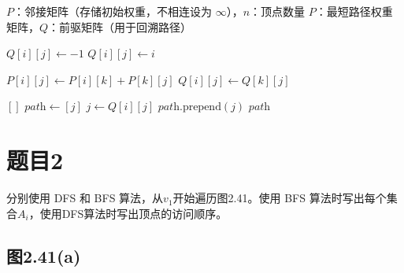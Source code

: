 \documentclass[utf8]{ctexart}
\theoremstyle{mystyle}
\begin{document}
\begin{algorithm}[H]
\caption{改进的 Warshall 算法}
\begin{algorithmic}[1]
    \Require $P$：邻接矩阵（存储初始权重，不相连设为 $\infty$），$n$：顶点数量
    \Ensure $P$：最短路径权重矩阵，$Q$：前驱矩阵（用于回溯路径）
    
    \State {}
                \State $Q[i][j] \gets -1$ 
            \Else
                \State $Q[i][j] \gets i$ 
            \EndIf
        \EndFor
    \EndFor

    \State {}
                    \State $P[i][j] \gets P[i][k] + P[k][j]$
                    \State $Q[i][j] \gets Q[k][j]$ 
                \EndIf
            \EndFor
        \EndFor
    \EndFor

     
            \State \Return $[]$ 
        \EndIf
        \State $\textit{path} \gets [j]$
            \State $j \gets Q[i][j]$ 
            \State $\textit{path}.\text{prepend}(j)$
        \EndWhile
        \State \Return $\textit{path}$
    \EndFunction
\end{algorithmic}
\end{algorithm}

\newpage

\section*{题目2}

\begin{problembox}
分别使用 DFS 和 BFS 算法，从$v_1$开始遍历图2.41。使用 BFS 算法时写出每个集合$A_i$，使用DFS算法时写出顶点的访问顺序。
\end{problembox}

\subsection*{图2.41(a)}
\end{document}
